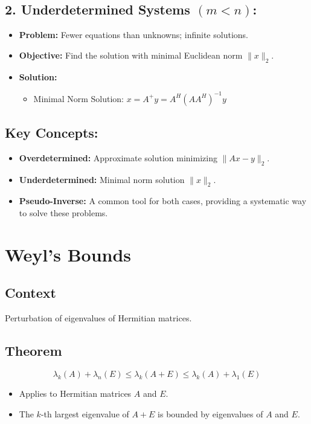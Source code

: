 \documentclass{article}
\begin{document}
\subsection*{2. Underdetermined Systems $(m < n)$:}

\begin{itemize}
    \item \textbf{Problem:} Fewer equations than unknowns; infinite solutions.
    \item \textbf{Objective:} Find the solution with minimal Euclidean norm $\|x\|_2$.
    \item \textbf{Solution:}
    \begin{itemize}
        \item Minimal Norm Solution: $x = A^+y = A^H(AA^H)^{-1}y$
    \end{itemize}
\end{itemize}

\subsection*{Key Concepts:}

\begin{itemize}
    \item \textbf{Overdetermined:} Approximate solution minimizing $\|Ax - y\|_2$.
    \item \textbf{Underdetermined:} Minimal norm solution $\|x\|_2$.
    \item \textbf{Pseudo-Inverse:} A common tool for both cases, providing a systematic way to solve these problems.
\end{itemize}


\section{Weyl's Bounds}

\subsection{Context}
Perturbation of eigenvalues of Hermitian matrices.

\subsection{Theorem}
\[
\lambda_k(A) + \lambda_n(E) \leq \lambda_k(A + E) \leq \lambda_k(A) + \lambda_1(E)
\]
\begin{itemize}
    \item Applies to Hermitian matrices $A$ and $E$.
    \item The $k$-th largest eigenvalue of $A + E$ is bounded by eigenvalues of $A$ and $E$.
\end{itemize}
\end{document}
